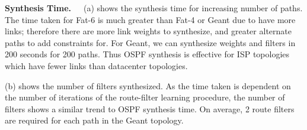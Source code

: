\noindent\textbf{Synthesis Time.}~~~(a) 
shows the synthesis time for increasing number of paths. 
The time taken for Fat-6 is much greater than Fat-4 or Geant
due to have more links; therefore there are more link weights
to synthesize, and greater alternate paths to add constraints for. 
For Geant, we can synthesize weights and filters in 200 seconds 
for 200 paths. Thus OSPF synthesis is effective for ISP topologies
which have fewer links than datacenter topologies.

(b) shows the number of filters synthesized. 
As the time taken is dependent on the number of iterations of
the route-filter learning procedure, the number of filters
shows a similar trend to OSPF synthesis time. On average, 2 route filters
are required for each path in the Geant topology. 
\begin{figure}
	\centering
\end{figure}

\begin{figure}
	\centering
\end{figure}


